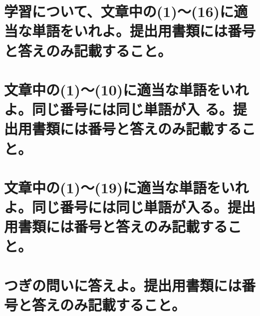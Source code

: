 \documentclass[titlepage,a4paper]{jsarticle}
\begin{document}
\section{学習について、文章中の(1)〜(16)に適当な単語をいれよ。提出用書類には番号と答えのみ記載すること。}%
\section{文章中の(1)〜(10)に適当な単語をいれよ。同じ番号には同じ単語が入 る。提出用書類には番号と答えのみ記載すること。}%
\section{文章中の(1)〜(19)に適当な単語をいれよ。同じ番号には同じ単語が入る。提出用書類には番号と答えのみ記載すること。}%
\section{つぎの問いに答えよ。提出用書類には番号と答えのみ記載すること。}%
\end{document}
